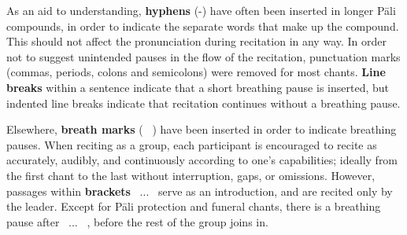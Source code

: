 \ifasixversion\vspace{-0.5cm}\fi

As an aid to understanding, \textbf{hyphens} (-) have often been inserted in longer Pāli compounds, in order to indicate the separate words that make up the compound. This should not affect the pronunciation during recitation in any way. In order not to suggest unintended pauses in the flow of the recitation, punctuation marks (commas, periods, colons and semicolons) were removed for most chants. \textbf{Line breaks} within a sentence indicate that a short breathing pause is inserted, but indented line breaks indicate that recitation continues without a breathing pause.

\ifasixversion\vspace{-0.5cm}\fi

Elsewhere, \textbf{breath marks} ( \abbrbreathmark\ ) have been inserted in order to indicate breathing pauses. When reciting as a group, each participant is encouraged to recite as accurately, audibly, and continuously according to one's capabilities; ideally from the first chant to the last without interruption, gaps, or omissions. However, passages within \textbf{brackets} \anglebracketleft\ \hspace{-0.5mm}... \hspace{-0.8mm}\anglebracketright\ serve as an introduction, and are recited only by the leader. Except for Pāli protection and funeral chants, there is a breathing pause after \anglebracketleft\ \hspace{-0.5mm}... \hspace{-0.8mm}\anglebracketright\ , before the rest of the group joins in.

\clearpage

